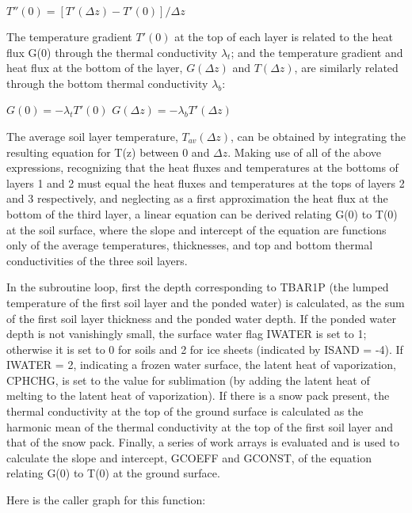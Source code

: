 $T''(0) = [T'(\Delta z) - T'(0)]/ \Delta z$

The temperature gradient $T'(0)$ at the top of each layer is related to the heat flux G(0) through the thermal conductivity $\lambda_t$; and the temperature gradient and heat flux at the bottom of the layer, $G(\Delta z)$ and $T(\Delta z)$, are similarly related through the bottom thermal conductivity $\lambda_b$\+:

$G(0) = - \lambda_t T'(0)$ $G(\Delta z) = - \lambda_b T'(\Delta z)$

The average soil layer temperature, $T_{av}(\Delta z)$, can be obtained by integrating the resulting equation for T(z) between 0 and $\Delta z$. Making use of all of the above expressions, recognizing that the heat fluxes and temperatures at the bottoms of layers 1 and 2 must equal the heat fluxes and temperatures at the tops of layers 2 and 3 respectively, and neglecting as a first approximation the heat flux at the bottom of the third layer, a linear equation can be derived relating G(0) to T(0) at the soil surface, where the slope and intercept of the equation are functions only of the average temperatures, thicknesses, and top and bottom thermal conductivities of the three soil layers.

In the subroutine loop, first the depth corresponding to T\+B\+A\+R1\+P (the lumped temperature of the first soil layer and the ponded water) is calculated, as the sum of the first soil layer thickness and the ponded water depth. If the ponded water depth is not vanishingly small, the surface water flag I\+W\+A\+T\+E\+R is set to 1; otherwise it is set to 0 for soils and 2 for ice sheets (indicated by I\+S\+A\+N\+D = -\/4). If I\+W\+A\+T\+E\+R = 2, indicating a frozen water surface, the latent heat of vaporization, C\+P\+H\+C\+H\+G, is set to the value for sublimation (by adding the latent heat of melting to the latent heat of vaporization). If there is a snow pack present, the thermal conductivity at the top of the ground surface is calculated as the harmonic mean of the thermal conductivity at the top of the first soil layer and that of the snow pack. Finally, a series of work arrays is evaluated and is used to calculate the slope and intercept, G\+C\+O\+E\+F\+F and G\+C\+O\+N\+S\+T, of the equation relating G(0) to T(0) at the ground surface.

Here is the caller graph for this function\+:


